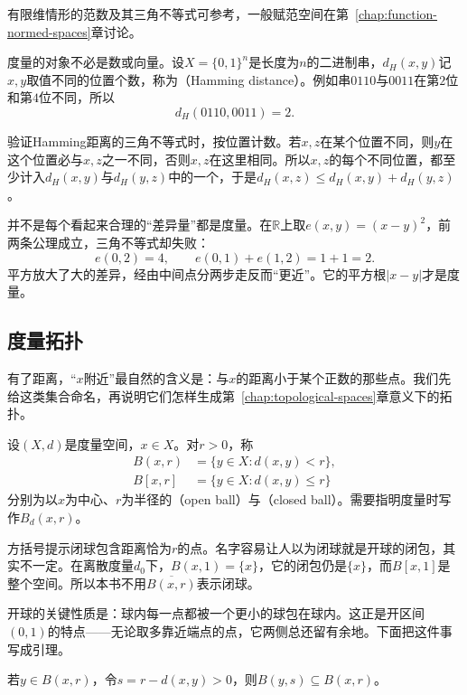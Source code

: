 有限维情形的范数及其三角不等式可参考，一般赋范空间在第~\ref{chap:function-normed-spaces}章讨论。

度量的对象不必是数或向量。设$X=\{0,1\}^n$是长度为$n$的二进制串，$d_H(x,y)$记$x,y$取值不同的位置个数，称为（Hamming distance）。例如串$0110$与$0011$在第$2$位和第$4$位不同，所以
\[
d_H(0110,0011)=2.
\]

验证Hamming距离的三角不等式时，按位置计数。若$x,z$在某个位置不同，则$y$在这个位置必与$x,z$之一不同，否则$x,z$在这里相同。所以$x,z$的每个不同位置，都至少计入$d_H(x,y)$与$d_H(y,z)$中的一个，于是$d_H(x,z)\leq d_H(x,y)+d_H(y,z)$。

并不是每个看起来合理的“差异量”都是度量。在$\mathbb R$上取$e(x,y)=(x-y)^2$，前两条公理成立，三角不等式却失败：
\[
e(0,2)=4,\qquad e(0,1)+e(1,2)=1+1=2.
\]
平方放大了大的差异，经由中间点分两步走反而“更近”。它的平方根$\lvert x-y\rvert$才是度量。

\subsection{度量拓扑}
\label{sec:metric-topology}

有了距离，“$x$附近”最自然的含义是：与$x$的距离小于某个正数的那些点。我们先给这类集合命名，再说明它们怎样生成第~\ref{chap:topological-spaces}章意义下的拓扑。

\begin{definition}[开球与闭球]
\label{def:metric-balls}
设$(X,d)$是度量空间，$x\in X$。对$r>0$，称
\begin{equation}
\begin{aligned}
B(x,r)&=\{y\in X:d(x,y)<r\},\\
B[x,r]&=\{y\in X:d(x,y)\leq r\}
\end{aligned}
\label{eq:metric-balls}
\end{equation}
分别为以$x$为中心、$r$为半径的（open ball）与（closed ball）。需要指明度量时写作$B_d(x,r)$。
\end{definition}

方括号提示闭球包含距离恰为$r$的点。名字容易让人以为闭球就是开球的闭包，其实不一定。在离散度量$d_0$下，$B(x,1)=\{x\}$，它的闭包仍是$\{x\}$，而$B[x,1]$是整个空间。所以本书不用$\overline{B(x,r)}$表示闭球。

开球的关键性质是：球内每一点都被一个更小的球包在球内。这正是开区间$(0,1)$的特点——无论取多靠近端点的点，它两侧总还留有余地。下面把这件事写成引理。

\begin{lemma}[开球内的小球]
\label{lem:metric-ball-inside-ball}
若$y\in B(x,r)$，令$s=r-d(x,y)>0$，则$B(y,s)\subseteq B(x,r)$。
\end{lemma}

